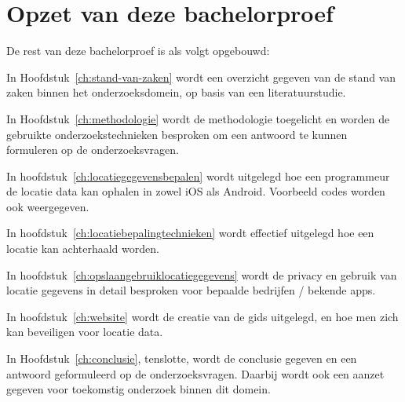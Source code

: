 \section{Opzet van deze bachelorproef}
\label{sec:opzet-bachelorproef}



De rest van deze bachelorproef is als volgt opgebouwd:

In Hoofdstuk~\ref{ch:stand-van-zaken} wordt een overzicht gegeven van de stand van zaken binnen het onderzoeksdomein, op basis van een literatuurstudie.

In Hoofdstuk~\ref{ch:methodologie} wordt de methodologie toegelicht en worden de gebruikte onderzoekstechnieken besproken om een antwoord te kunnen formuleren op de onderzoeksvragen.


In hoofdstuk~\ref{ch:locatiegegevensbepalen} wordt uitgelegd hoe een programmeur de locatie data kan ophalen in zowel iOS als Android. Voorbeeld codes worden ook weergegeven.

In hoofdstuk~\ref{ch:locatiebepalingtechnieken} wordt effectief uitgelegd hoe een locatie kan achterhaald worden. 

In hoofdstuk~\ref{ch:opslaangebruiklocatiegegevens} wordt de privacy en gebruik van locatie gegevens in detail besproken voor bepaalde bedrijfen / bekende apps. 



In hoofdstuk~\ref{ch:website} wordt de creatie van de gids uitgelegd, en hoe men zich kan beveiligen voor locatie data.



In Hoofdstuk~\ref{ch:conclusie}, tenslotte, wordt de conclusie gegeven en een antwoord geformuleerd op de onderzoeksvragen. Daarbij wordt ook een aanzet gegeven voor toekomstig onderzoek binnen dit domein.

